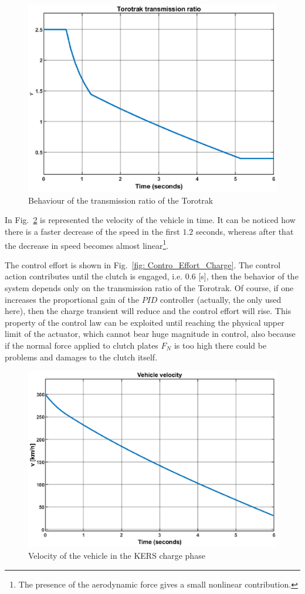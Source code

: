 \documentclass[11pt]{article}
\begin{document}
\begin{figure}[H]
\centering
\includegraphics[width=.6\textwidth]{Images/Results_Dynamics/Charge/Torotrak_ratio.eps}
\caption{Behaviour of the transmission ratio of the Torotrak}
\label{fig: CVT_ratio_charge}
\end{figure}

In Fig.~\ref{fig: Vehicel_Vel_Charge} is represented the velocity of the vehicle in time. It can be noticed how there is a faster decrease of the speed in the first $1.2$ seconds, whereas after that the decrease in speed becomes almost linear\footnote{The presence of the aerodynamic force gives a small nonlinear contribution.}. 

The control effort is shown in Fig.~\ref{fig: Contro_Effort_Charge}. The control action contributes until the clutch is engaged, i.e. $0.6$ [s], then the behavior of the system depends only on the transmission ratio of the Torotrak. Of course, if one increases the proportional gain of the $PID$ controller (actually, the only used here), then the charge transient will reduce and the control effort will rise. This property of the control law can be exploited until reaching the physical upper limit of the actuator, which cannot bear huge magnitude in control, also because if the normal force applied to clutch plates $F_N$ is too high there could be problems and damages to the clutch itself.

\begin{figure}[H]
\centering
\includegraphics[width=.6\textwidth]{Images/Results_Dynamics/Charge/Vehicle_Vel.eps}
\caption{Velocity of the vehicle in the KERS charge phase}
\label{fig: Vehicel_Vel_Charge}
\end{figure}
\end{document}
